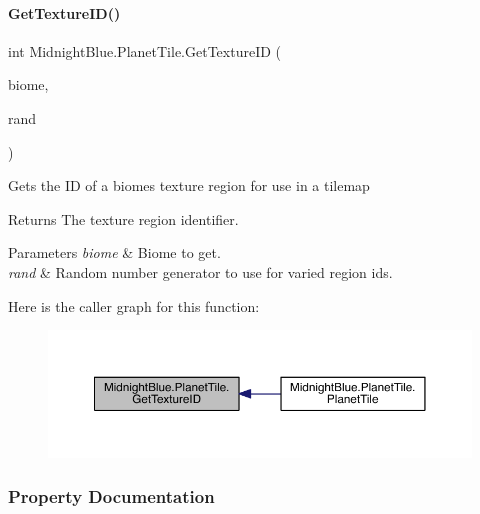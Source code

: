 \paragraph{\texorpdfstring{Get\+Texture\+I\+D()}{GetTextureID()}}
{\footnotesize\ttfamily int Midnight\+Blue.\+Planet\+Tile.\+Get\+Texture\+ID (\begin{DoxyParamCaption}\item[{\hyperlink{namespace_midnight_blue_a8a6ba5637b64c3eb991f00d48decf381}{Biome}}]{biome,  }\item[{Random}]{rand }\end{DoxyParamCaption})\hspace{0.3cm}{\ttfamily [inline]}}



Gets the ID of a biomes texture region for use in a tilemap 

\begin{DoxyReturn}{Returns}
The texture region identifier.
\end{DoxyReturn}

\begin{DoxyParams}{Parameters}
{\em biome} & Biome to get.\\
\hline
{\em rand} & Random number generator to use for varied region id\textquotesingle{}s.\\
\hline
\end{DoxyParams}
Here is the caller graph for this function\+:\nopagebreak
\begin{figure}[H]
\begin{center}
\leavevmode
\includegraphics[width=350pt]{class_midnight_blue_1_1_planet_tile_a0ba5d9886790e8f8d9e54e1873d5565b_icgraph}
\end{center}
\end{figure}


\subsubsection{Property Documentation}
\hypertarget{class_midnight_blue_1_1_planet_tile_a56f9f50efa0b740b3ce229cb4170fd97}{}\label{class_midnight_blue_1_1_planet_tile_a56f9f50efa0b740b3ce229cb4170fd97} 
